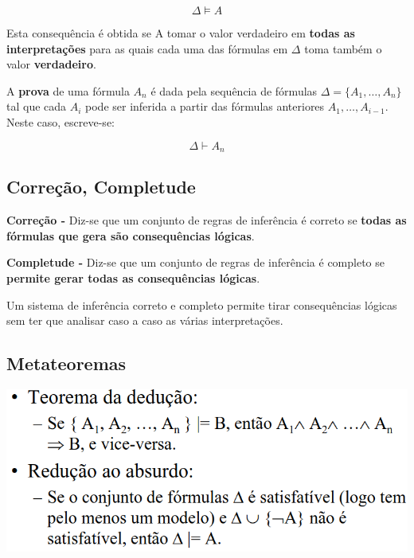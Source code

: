 \documentclass{article}
\begin{document}
\[ \Delta \vDash A \]

Esta consequência é obtida se A tomar o valor verdadeiro em \textbf{todas as interpretações} para as
quais cada uma das fórmulas em $\Delta$ toma também o valor \textbf{verdadeiro}.

\vspace{2mm}

A \textbf{prova} de uma fórmula $A_n$ é dada pela sequência de fórmulas $\Delta = \{ A_1, \dots, A_n \}$ tal que cada $A_i$
pode ser inferida a partir das fórmulas anteriores $A_1, \dots, A_{i-1}$. Neste caso, escreve-se:

\[ \Delta \vdash A_n \]

\pagebreak

\subsection{Correção, Completude}

\begin{flushleft}
  \textbf{Correção -} Diz-se que um conjunto de regras de
  inferência é correto se \textbf{todas as fórmulas que gera são
  consequências lógicas}.

  \vspace{2mm}

  \textbf{Completude -} Diz-se que um conjunto de regras de
  inferência é completo se \textbf{permite gerar todas as
  consequências lógicas}.
\end{flushleft}

Um sistema de inferência correto e completo permite tirar consequências lógicas sem ter que analisar caso a
caso as várias interpretações.

\subsection{Metateoremas}

\vspace{2mm}

\begin{center}
  \includegraphics[scale=0.3]{37}
\end{center}
\end{document}
